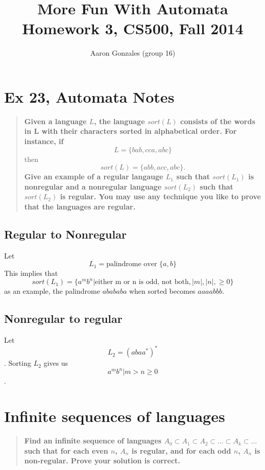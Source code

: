 \documentclass[titlepage]{article}\usepackage[]{graphicx}\usepackage[]{color}
\begin{document}
\title{More Fun With Automata \\ Homework 3, CS500, Fall 2014}
\author{Aaron Gonzales (group 16)}
\maketitle


\section{Ex 23, Automata Notes}
\begin{quote}
  \textbf{Given a language \(L\), the language \(sort(L)\) consists of the words
  in L with their characters sorted in alphabetical order. For instance, if }
  \[ L = \{ bab, cca, abc\} \]
  then
  \[ sort(L) = \{ abb, acc, abc\}. \]
  \textbf{Give an example of a regular langauge \(L_1\) such that
  \(sort(L_1)\)  is nonregular and a nonregular language \(sort(L_2)\) such
  that \(sort(L_2)\) is regular. You may use any technique you like to prove that
  the languages are regular.}
\end{quote}
\subsection{Regular to Nonregular}
Let \[ L_1 = \text{palindrome over } \{ a,b \} \]
This implies that 
\[ sort(L_1) = \{a^mb^n | \text{either m or n is odd, not both}, |m|, |n|, \geq
0\} \]
as an example, the palindrome $abababa$ when sorted becomes $aaaabbb$. 

\subsection{Nonregular to regular}
Let \[ L_2 = (abaa^*)^* \].
Sorting $L_2$ gives us \[ a^mb^n | m > n \geq 0 \].


\section{Infinite sequences of languages}
\begin{quote}
  \textbf{Find an infinite sequence of languages \( A_0 \subset A_1 \subset A_2
    \subset \dots \subset A_k \subset \dots \)
    such that for each even \( n \), \( A_n\) is regular, and for each odd
    \(n\), \(A_n \) is non-regular. Prove your solution is correct.}
\end{quote}
\end{document}
